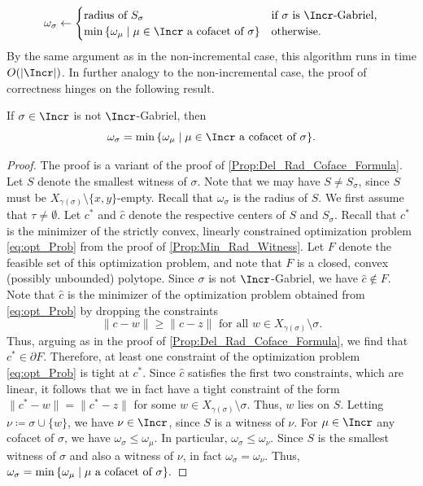 \[
\omega_{\sigma} \leftarrow
\begin{cases}
\text{radius of } S_\sigma & \text{if } \sigma \text{ is $\Incr$-Gabriel,} \\
\min\, \{\omega_{\mu} \mid \mu\in \Incr \textup{ a cofacet of } \sigma\} & \text{otherwise.}
\end{cases}
\]
By the same argument as in the non-incremental case, this algorithm runs in time $O(|\Incr|)$.  In further analogy to the non-incremental case, the 
proof of correctness hinges on the following result.
%
\begin{proposition}\label{Prop:Incr_Cofact_Formula}
If $\sigma \in \Incr$ is not $\Incr$-Gabriel, then \[\omega_\sigma =\min\, \{\omega_{\mu} \mid \mu\in \Incr \textup{ a cofacet of } \sigma\} .\]
\end{proposition}
%
\begin{proof}
The proof is a variant of the proof of \cref{Prop:Del_Rad_Coface_Formula}.  Let $S$ denote the smallest witness of $\sigma$.  Note that we may have $S\ne S_{\sigma}$, since $S$ must be $X_{\gamma(\sigma)}\setminus \{x,y\}$-empty.  Recall that  $\omega_{\sigma}$ is the radius of $S$.  
%
We first assume that $\tau\ne \emptyset$.  Let $c^*$ and $\hat c$ denote the respective centers of $S$ and $S_{\sigma}$. Recall that $c^*$ is the minimizer of the strictly convex, linearly constrained optimization problem \eqref{eq:opt_Prob} from the proof of \cref{Prop:Min_Rad_Witness}.  
Let $F$ denote the feasible set of this optimization problem, and note that $F$ is a closed, convex (possibly unbounded) polytope.  Since $\sigma$ is not $\Incr$-Gabriel, we have $\hat c\not \in F$.  Note that $\hat c$ is the minimizer of the optimization problem obtained from \eqref{eq:opt_Prob} by dropping the constraints 
\[  \|c - w\| \geq \|c - z\|
            \text{ for all } w \in X_{\gamma(\sigma)} \setminus \sigma.\]
Thus, arguing as in the proof of \cref{Prop:Del_Rad_Coface_Formula}, we find  that $c^*\in \partial F$.  Therefore, at least one constraint of the optimization problem \eqref{eq:opt_Prob} is tight at $c^*$.  Since $\hat c$ satisfies the first two constraints, which are linear, it follows that we in fact have a tight constraint of the form $\|c^* - w\| = \|c^* - z\|$ for some $w \in X_{\gamma(\sigma)} \setminus \sigma$.  Thus, $w$ lies on $S$.  Letting $\nu\coloneqq \sigma\cup\{w\}$, we have $\nu\in \Incr$, since $S$ is a witness of $\nu$.  
%
For $\mu\in \Incr$ any cofacet of $\sigma$, we have  $\omega_{\sigma}\leq \omega_{\mu}$.  In particular, $\omega_{\sigma}\leq \omega_{\nu}$.  Since $S$ is the smallest witness of $\sigma$ and also a witness of $\nu$, in fact $ \omega_{\sigma}=\omega_{\nu}$.  Thus, $\omega_\sigma = {\min\, \{ \omega_\mu\mid \mu \textup{ a cofacet of } \sigma\}}.$

\end{proof}
